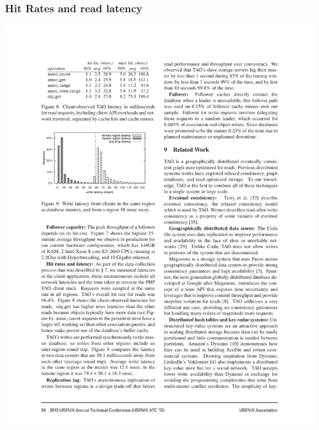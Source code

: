 \begin{frame}[c]\frametitle{Hit Rates and read latency}
\centering
\includegraphics[width=\textwidth]{figs/table8.pdf} 

\end{frame}

